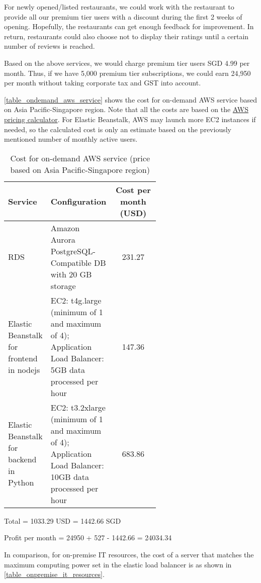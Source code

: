 \documentclass[a4paper]{article}
\begin{document}
For newly opened/listed restaurants, we could work with the restaurant to provide all our premium tier users with a discount during the first 2 weeks of opening. Hopefully, the restaurants can get enough feedback for improvement. In return, restaurants could also choose not to display their ratings until a certain number of reviews is reached.

Based on the above services, we would charge premium tier users SGD 4.99 per month. Thus, if we have 5,000 premium tier subscriptions, we could earn 24,950 per month without taking corporate tax and GST into account.

\autoref{table_ondemand_aws_service} shows the cost for on-demand AWS service based on Asia Pacific-Singapore region. Note that all the costs are based on the \href{https://calculator.aws/#}{AWS pricing calculator}. For Elastic Beanstalk, AWS may launch more EC2 instances if needed, so the calculated cost is only an estimate based on the previously mentioned number of monthly active users.

\begin{table}[H]
	\centering
	\begin{tabular}{p{0.2\linewidth}|p{0.4\linewidth}|c}	%
	\hline \hline
	Service
	    & Configuration
	    & Cost per month (USD)\\
		\hline
	RDS
		& Amazon Aurora PostgreSQL-Compatible DB with 20 GB storage
		& 231.27 \\
	Elastic Beanstalk for frontend in nodejs
		& EC2: t4g.large (minimum of 1 and maximum of 4); Application Load Balancer: 5GB data processed per hour
		& 147.36 \\
	Elastic Beanstalk for backend in Python
	    & EC2: t3.2xlarge (minimum of 1 and maximum of 4); Application Load Balancer: 10GB data processed per hour
    	& 683.86 \\
	\hline \hline
	\end{tabular}
	\caption{Cost for on-demand AWS service (price based on Asia Pacific-Singapore region)}
	\label{table_ondemand_aws_service}
\end{table}

Total = 1033.29 USD = 1442.66 SGD

Profit per month = 24950 + 527 - 1442.66 = 24034.34

In comparison, for on-premise IT resources, the cost of a server that matches the maximum computing power set in the elastic load balancer is as shown in \autoref{table_onpremise_it_resources}.
\end{document}
